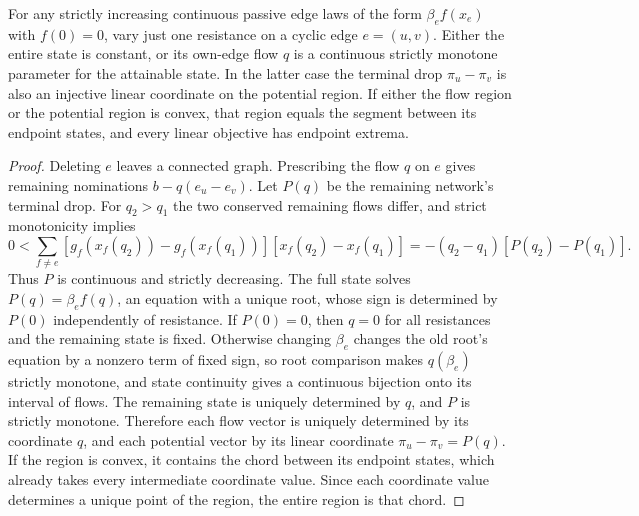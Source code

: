\begin{lemma}
\label{lem:a-weight-deletion}
For any strictly increasing continuous passive edge laws of the form
$\beta_ef(x_e)$ with $f(0)=0$, vary just one resistance on a cyclic edge
$e=(u,v)$. Either the entire state is constant, or its own-edge flow $q$
is a continuous strictly monotone parameter for the attainable state.
In the latter case the terminal drop $\pi_u-\pi_v$ is also an injective
linear coordinate on the potential region. If either the flow region
or the potential region is convex, that region equals the segment between
its endpoint states, and every linear objective has endpoint extrema.
\end{lemma}
\begin{proof}
Deleting $e$ leaves a connected graph. Prescribing the flow $q$ on $e$
gives remaining nominations $b-q(e_u-e_v)$. Let $P(q)$ be the remaining
network's terminal drop. For $q_2>q_1$ the two conserved remaining flows
differ, and strict monotonicity implies
\[
 0<\sum_{f\ne e}[g_f(x_f(q_2))-g_f(x_f(q_1))]
                      [x_f(q_2)-x_f(q_1)]
   =-(q_2-q_1)[P(q_2)-P(q_1)].
\]
Thus $P$ is continuous and strictly decreasing. The full state solves
$P(q)=\beta_ef(q)$, an equation with a unique root, whose sign is
determined by $P(0)$ independently of resistance. If $P(0)=0$, then $q=0$
for all resistances and the remaining state is fixed. Otherwise changing
$\beta_e$ changes the old root's equation by a nonzero term of fixed
sign, so root comparison makes $q(\beta_e)$ strictly monotone, and state
continuity gives a continuous bijection onto its interval of flows.
The remaining state is uniquely determined by $q$, and $P$ is strictly
monotone. Therefore each flow vector is uniquely determined by its
coordinate $q$, and each potential vector by its linear coordinate
$\pi_u-\pi_v=P(q)$. If the region is convex, it contains the chord between
its endpoint states, which already takes every intermediate coordinate
value. Since each coordinate value determines a unique point of the
region, the entire region is that chord.
\end{proof}

